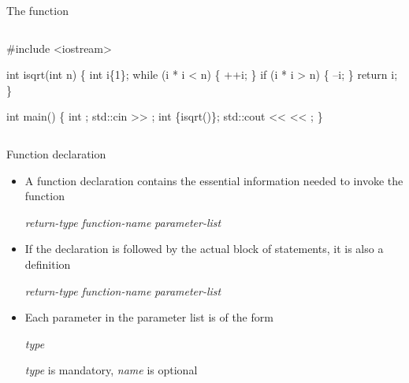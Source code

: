 \begin{frame}[fragile]{The  function}

  \begin{columns}[T]

    \begin{column}{.6\textwidth}
      \begin{codeblock}
#include <iostream>

int isqrt(int \alert<2>{n})  
\{
  int i\{1\};
  while (i * i < n) \{
    ++i;
  \}
  if (i * i > n) \{
    --i;
  \}
  return \alert<2>{i};      
\}

int main()
\{
  int \alt<1>{n}{\alert<2>{num}};
  std::cin >{}> ;
  int \{isqrt()\};  
  std::cout <{}<  <{}< \bslashn;
\}\end{codeblock}
    \end{column}

  \end{columns}

\end{frame}

\begin{frame}{Function declaration}

  \begin{itemize}[<+->]
  \item A function \alert{declaration} contains the essential information needed
    to invoke the function

    \textit{return-type} \textit{function-name} \code{(} \textit{parameter-list} \code{);}

  \item If the declaration is followed by the actual block of statements, it is
    also a \alert{definition}

    \textit{return-type} \textit{function-name} \code{(} \textit{parameter-list} \code{) \{ \ddd{} \}}

  \item Each parameter in the parameter list is of the form

    \textit{type }

    \textit{type} is mandatory, \textit{name} is optional

  \end{itemize}
\end{frame}

